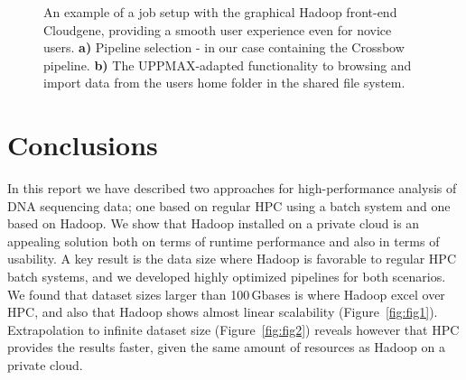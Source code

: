 \documentclass[11pt, oneside]{article}   	%
\begin{document}
\begin{figure}
\begin{subfigure}[b]{0.6\textwidth}
		\subcaption{}
	\end{subfigure}
	\caption{An example of a job setup with the graphical Hadoop front-end Cloudgene, providing a smooth user experience even for novice users. \textbf{a)} Pipeline selection - in our case containing the Crossbow pipeline. \textbf{b)} The UPPMAX-adapted functionality to browsing and import data from the users home folder in the shared file system.}
	\label{fig:fig4}
\end{figure}


\section{Conclusions}
\label{sectionV}

In this report we have described two approaches for high-performance analysis of DNA sequencing data; one based on regular HPC using a batch system and one based on Hadoop. We show that Hadoop installed on a private cloud is an appealing solution both on terms of runtime performance and also in terms of usability. A key result is the data size where Hadoop is favorable to regular HPC batch systems, and we developed highly optimized pipelines for both scenarios. We found that dataset sizes larger than 100\,Gbases is where Hadoop excel over HPC, and also that Hadoop shows almost linear scalability (Figure~\ref{fig:fig1}). Extrapolation to infinite dataset size (Figure~\ref{fig:fig2}) reveals however that HPC provides the results faster, given the same amount of resources as Hadoop on a private cloud.


\end{document}
